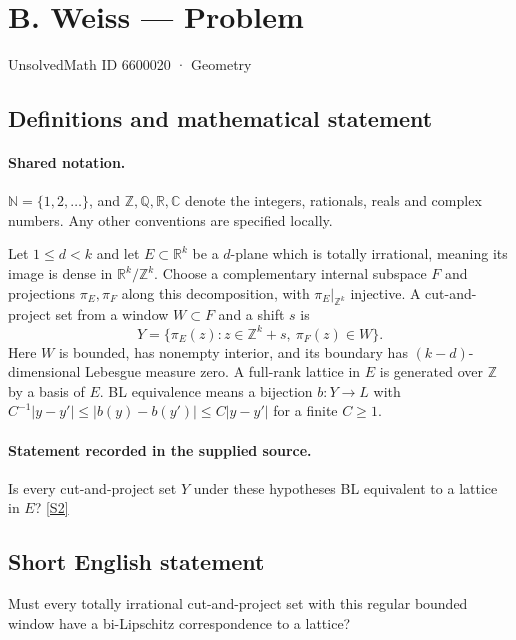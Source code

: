 \documentclass[11pt]{article}
\newcommand{\sref}[2]{\hyperlink{source:#1:#2}{[S#2]}}
\begin{document}
\setcounter{section}{6600019}
\section{B. Weiss — Problem}\label{6600020}
{\small\sffamily UnsolvedMath ID 6600020 · Geometry}
\subsection{Definitions and mathematical statement}

\paragraph{Shared notation.}$\mathbb N=\{1,2,\ldots\}$, and $\mathbb Z,\mathbb Q,\mathbb R,\mathbb C$ denote the integers, rationals, reals and complex numbers. Any other conventions are specified locally.


Let $1\leq d<k$ and let $E\subset\mathbb R^k$ be a $d$-plane which is totally irrational, meaning its image is dense in $\mathbb R^k/\mathbb Z^k$. Choose a complementary internal subspace $F$ and projections $\pi_E,\pi_F$ along this decomposition, with $\pi_E|_{\mathbb Z^k}$ injective. A cut-and-project set from a window $W\subset F$ and a shift $s$ is
\[Y=\{\pi_E(z):z\in\mathbb Z^k+s,\ \pi_F(z)\in W\}.\]
Here $W$ is bounded, has nonempty interior, and its boundary has $(k-d)$-dimensional Lebesgue measure zero. A full-rank lattice in $E$ is generated over $\mathbb Z$ by a basis of $E$. BL equivalence means a bijection $b:Y\to L$ with $C^{-1}|y-y'|\leq|b(y)-b(y')|\leq C|y-y'|$ for a finite $C\geq1$.
\paragraph{Statement recorded in the supplied source.}
Is every cut-and-project set $Y$ under these hypotheses BL equivalent to a lattice in $E$? \sref{6600020}{2}
\subsection{Short English statement}
Must every totally irrational cut-and-project set with this regular bounded window have a bi-Lipschitz correspondence to a lattice?
\end{document}
